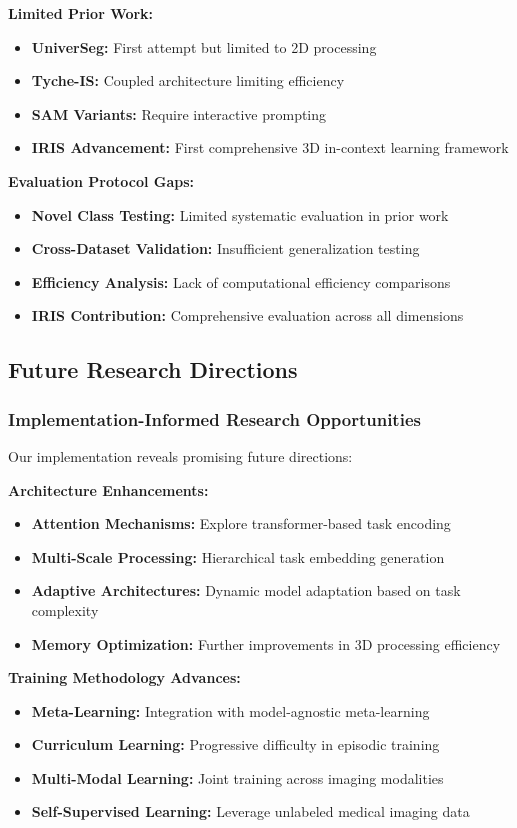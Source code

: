 \textbf{Limited Prior Work:}
\begin{itemize}
    \item \textbf{UniverSeg:} First attempt but limited to 2D processing
    \item \textbf{Tyche-IS:} Coupled architecture limiting efficiency
    \item \textbf{SAM Variants:} Require interactive prompting
    \item \textbf{IRIS Advancement:} First comprehensive 3D in-context learning framework
\end{itemize}

\textbf{Evaluation Protocol Gaps:}
\begin{itemize}
    \item \textbf{Novel Class Testing:} Limited systematic evaluation in prior work
    \item \textbf{Cross-Dataset Validation:} Insufficient generalization testing
    \item \textbf{Efficiency Analysis:} Lack of computational efficiency comparisons
    \item \textbf{IRIS Contribution:} Comprehensive evaluation across all dimensions
\end{itemize}

\subsection*{Future Research Directions}

\subsubsection*{Implementation-Informed Research Opportunities}
Our implementation reveals promising future directions:

\textbf{Architecture Enhancements:}
\begin{itemize}
    \item \textbf{Attention Mechanisms:} Explore transformer-based task encoding
    \item \textbf{Multi-Scale Processing:} Hierarchical task embedding generation
    \item \textbf{Adaptive Architectures:} Dynamic model adaptation based on task complexity
    \item \textbf{Memory Optimization:} Further improvements in 3D processing efficiency
\end{itemize}

\textbf{Training Methodology Advances:}
\begin{itemize}
    \item \textbf{Meta-Learning:} Integration with model-agnostic meta-learning
    \item \textbf{Curriculum Learning:} Progressive difficulty in episodic training
    \item \textbf{Multi-Modal Learning:} Joint training across imaging modalities
    \item \textbf{Self-Supervised Learning:} Leverage unlabeled medical imaging data
\end{itemize}

